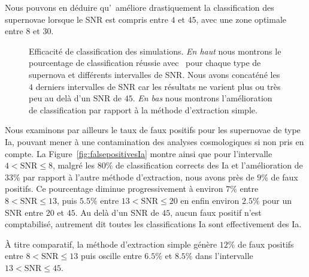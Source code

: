 \documentclass[../main/main.tex]{subfiles}
\begin{document}
Nous pouvons en déduire qu'\hypergal\ améliore drastiquement la
classification des supernovae lorsque le SNR est compris entre $4$ et
$45$, avec une zone optimale entre $8$ et $30$.

\begin{figure}[ht]
  \centering
  \caption[Efficacité de classification des simulations.]{Efficacité de
    classification des simulations. \emph{En haut} nous montrons le pourcentage
  de classification réussie avec \hypergal\ pour chaque type de
  supernova et différents intervalles de SNR. Nous avons concaténé les $4$
  derniers intervalles de SNR car les résultats ne varient plus ou très
  peu au delà d'un SNR de $45$. \emph{En bas} nous montrons
  l'amélioration de classification par rapport à la méthode d'extraction
simple. }
  \label{fig:typingimprove_snr}
\end{figure}

Nous examinons par ailleurs le taux de faux positifs pour les supernovae
de type Ia, pouvant mener à une contamination des analyses cosmologiques
si non pris en compte. La Figure~\ref{fig:falsepositivesIa} montre ainsi
que pour l'intervalle $4<\text{SNR}\leq8$, malgré les $80\%$ de
classification corrects des Ia et l'amélioration de $33\%$ par rapport à
l'autre méthode d'extraction, nous avons près de $9\%$ de faux
positifs. Ce pourcentage diminue progressivement à environ $7\%$ entre
$8<\text{SNR}\leq13$, puis $5.5\%$ entre $13<\text{SNR}\leq20$ en enfin
environ $2.5\%$ pour un SNR entre $20$ et $45$. Au delà
d'un SNR de $45$, aucun faux positif n'est comptabilisé, autrement dit
toutes les classifications Ia sont effectivement des Ia.

À titre comparatif, la méthode d'extraction simple génère $12\%$ de faux
positifs entre  $8<\text{SNR}\leq13$ puis oscille entre $6.5\%$ et
$8.5\%$ dans l'intervalle $13<\text{SNR}\leq45$.
\end{document}
